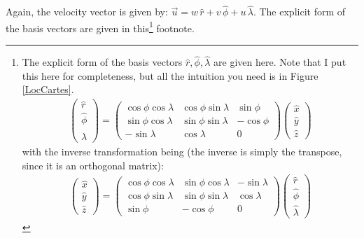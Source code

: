 Again, the velocity vector is given by: \(\vec{u}=w\,\hat{r}+v\,\hat{\phi}+u\,\hat{\lambda}\). The explicit form of the basis vectors are given in this\footnote{
    The explicit form of the basis vectors \(\hat{r},\hat{\phi},\hat{\lambda}\) are given here. Note that I put this here for completeness, but all the intuition you need is in Figure \ref{LocCartes}. 
    \begin{align*}
        \left( \begin{array}{c}
            \hat{r}
            \\
            \hat{\phi}
            \\
            \hat{\lambda}
        \end{array} \right)
        =
        \left( \begin{array}{ccc}
            \cos\phi\cos\lambda & \cos\phi\sin\lambda & \sin\phi
            \\
            \sin\phi\cos\lambda & \sin\phi\sin\lambda & -\cos\phi
            \\
            -\sin\lambda & \cos\lambda & 0
        \end{array} \right)
        \left( \begin{array}{c}
            \hat{x}
            \\
            \hat{y}
            \\
            \hat{z}
        \end{array} \right)
    \end{align*}
    with the inverse transformation being (the inverse is simply the transpose, since it is an orthogonal matrix):
    \begin{align*}
        \left( \begin{array}{c}
            \hat{x}
            \\
            \hat{y}
            \\
            \hat{z}
        \end{array} \right)
        =
        \left( \begin{array}{ccc}
            \cos\phi\cos\lambda & \sin\phi\cos\lambda & -\sin\lambda
            \\
            \cos\phi\sin\lambda & \sin\phi\sin\lambda & \cos\lambda
            \\
            \sin\phi & -\cos\phi & 0
        \end{array} \right)
        \left( \begin{array}{c}
            \hat{r}
            \\
            \hat{\phi}
            \\
            \hat{\lambda}
        \end{array} \right)
    \end{align*}
} footnote.

